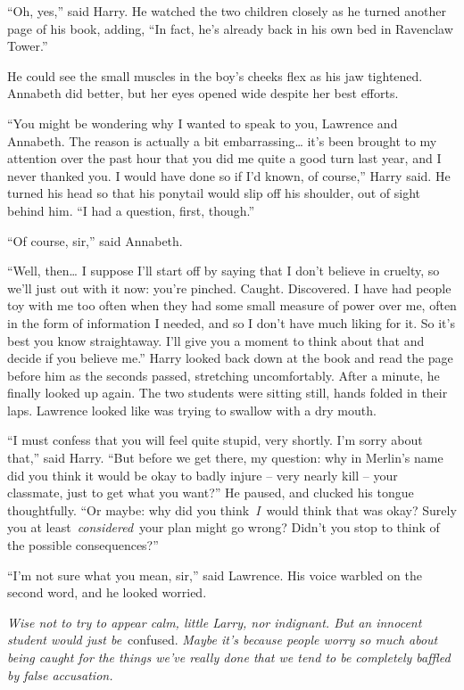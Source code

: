 ``Oh, yes,'' said Harry. He watched the two children closely as he
turned another page of his book, adding, ``In fact, he's already back in
his own bed in Ravenclaw Tower.''

He could see the small muscles in the boy's cheeks flex as his jaw
tightened. Annabeth did better, but her eyes opened wide despite her
best efforts.

``You might be wondering why I wanted to speak to you, Lawrence and
Annabeth. The reason is actually a bit embarrassing\ldots{} it's been
brought to my attention over the past hour that you did me quite a good
turn last year, and I never thanked you. I would have done so if I'd
known, of course,'' Harry said. He turned his head so that his ponytail
would slip off his shoulder, out of sight behind him. ``I had a
question, first, though.''

``Of course, sir,'' said Annabeth.

``Well, then\ldots{} I suppose I'll start off by saying that I don't
believe in cruelty, so we'll just out with it now: you're pinched.
Caught. Discovered. I have had people toy with me too often when they
had some small measure of power over me, often in the form of
information I needed, and so I don't have much liking for it. So it's
best you know straightaway. I'll give you a moment to think about that
and decide if you believe me.'' Harry looked back down at the book and
read the page before him as the seconds passed, stretching
uncomfortably. After a minute, he finally looked up again. The two
students were sitting still, hands folded in their laps. Lawrence looked
like was trying to swallow with a dry mouth.

``I must confess that you will feel quite stupid, very shortly. I'm
sorry about that,'' said Harry. ``But before we get there, my question:
why in Merlin's name did you think it would be okay to badly injure --
very nearly kill -- your classmate, just to get what you want?'' He
paused, and clucked his tongue thoughtfully. ``Or maybe: why did you
think~\emph{I}~would think that was okay? Surely you at
least~\emph{considered}~your plan might go wrong? Didn't you stop to
think of the possible consequences?''

``I'm not sure what you mean, sir,'' said Lawrence. His voice warbled on
the second word, and he looked worried.

\emph{Wise not to try to appear calm, little Larry, nor indignant. But
an innocent student would just be}~confused. \emph{Maybe it's because
people worry so much about being caught for the things we've really done
that we tend to be completely baffled by false accusation.}

